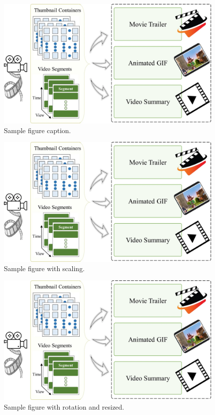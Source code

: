 \documentclass[stu,12pt,floatsintext]{apa7}
\begin{document}
\begin{figure}[ht]
    \centering
    \includegraphics[width=0.75\linewidth]{figures/sample_img.png}
    \caption{Sample figure caption.}
    \label{fig:writing_scores}
\end{figure}

\begin{figure}[ht]
    \centering
    \includegraphics[scale=0.3]{figures/sample_img.png}
    \caption{Sample figure with scaling.}
    \label{fig:scaled_sample}
\end{figure}


\begin{figure}[ht]
    \centering
    \includegraphics[angle=90, width=0.5\linewidth]{figures/sample_img.png}
    \caption{Sample figure with rotation and resized.}
    \label{fig:rotated_sample}
\end{figure}
\end{document}
